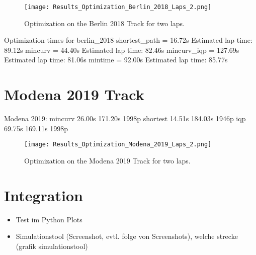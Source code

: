 \begin{figure}[H]
    \centering
    \texttt{[image: Results\_Optimization\_Berlin\_2018\_Laps\_2.png]}
    \caption{Optimization on the Berlin 2018 Track for two laps.}
    \label{fig:Results Berlin 2018 Laps 2}
\end{figure}

Optimization times for berlin\_2018
shortest\_path = 16.72s
Estimated lap time: 89.12s
mincurv = 44.40s
Estimated lap time: 82.46s
mincurv\_iqp = 127.69s
Estimated lap time: 81.06s
mintime = 92.00s
Estimated lap time: 85.77s

\section{Modena 2019 Track} \label{sec:Results Modena 2019 Track}
Modena 2019:
mincurv 26.00s 171.20s 1998p
shortest 14.51s 184.03s 1946p
iqp 69.75s 169.11s 1998p

\begin{figure}[H]
    \centering
    \texttt{[image: Results\_Optimization\_Modena\_2019\_Laps\_2.png]}
    \caption{Optimization on the Modena 2019 Track for two laps.}
    \label{fig:Results Modena 2019 Laps 2}
\end{figure}

\section{Integration}
\begin{itemize}
    \item Test im Python Plots
    \item Simulationstool (Screenshot, evtl. folge von Screenshots), welche strecke (grafik simulationstool)
\end{itemize}

